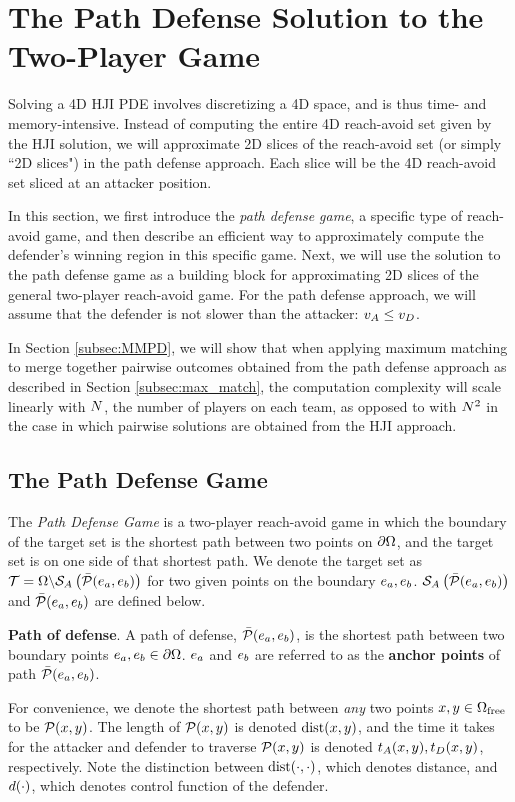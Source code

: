 \section{The Path Defense Solution to the Two-Player Game}
\label{sec:path_defense}
Solving a 4D HJI PDE involves discretizing a 4D space, and is thus time- and memory-intensive. Instead of computing the entire 4D reach-avoid set given by the HJI solution, we will approximate 2D slices of the reach-avoid set (or simply ``2D slices") in the path defense approach. Each slice will be the 4D reach-avoid set sliced at an attacker position.

In this section, we first introduce the \textit{path defense game}, a specific type of reach-avoid game, and then describe an efficient way to approximately compute the defender's winning region in this specific game. Next, we will use the solution to the path defense game as a building block for approximating 2D slices of the general two-player reach-avoid game. For the path defense approach, we will assume that the defender is not slower than the attacker: $v_A \leq v_D$. 

In Section \ref{subsec:MMPD}, we will show that when applying maximum matching to merge together pairwise outcomes obtained from the path defense approach as described in Section \ref{subsec:max_match}, the computation complexity will scale linearly with $N$, the number of players on each team, as opposed to with $N^2$ in the case in which pairwise solutions are obtained from the HJI approach.



\subsection{The Path Defense Game}
\label{subsec:pd_game}
The \textit{Path Defense Game} is a two-player reach-avoid game in which the boundary of the target set is the shortest path between two points on $\partial\Omega$, and the target set is on one side of that shortest path. We denote the target set as $\mathcal{T}=\Omega\backslash\mathcal{S}_A\left(\bar{\mathcal{P}}(e_a,e_b)\right)$ for two given points on the boundary $e_a,e_b$. $\mathcal{S}_A\left(\bar{\mathcal{P}}(e_a,e_b)\right)$ and $\bar{\mathcal{P}}(e_a,e_b)$ are defined below. 

\begin{defn} %
\textbf{Path of defense}. A path of defense, $\bar{\mathcal{P}}(e_a,e_b)$, is the shortest path between two boundary points $e_a,e_b\in\partial\Omega$. $e_a$ and $e_b$ are referred to as the \textbf{anchor points} of path $\bar{\mathcal{P}}(e_a,e_b)$. 

For convenience, we denote the shortest path between \textit{any} two points $x,y\in\Omega_{\text{free}}$ to be $\mathcal{P}(x,y)$. The length of $\mathcal{P}(x,y)$ is denoted $\text{dist}(x,y)$, and the time it takes for the attacker and defender to traverse $\mathcal{P}(x,y)$ is denoted $t_A(x, y),t_D(x,y)$, respectively. Note the distinction between $\text{dist}(\cdot,\cdot)$, which denotes distance, and $d(\cdot)$, which denotes control function of the defender.
\end{defn}

